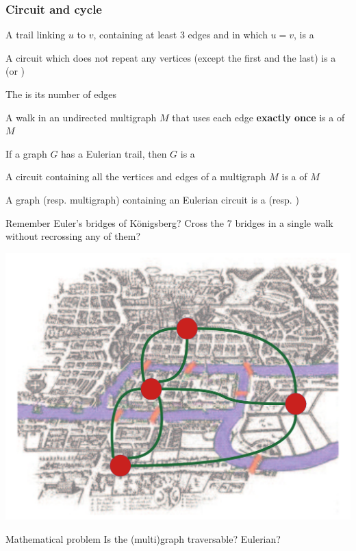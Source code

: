 \documentclass[aspectratio=43]{beamer}
\begin{document}
\begin{frame}\frametitle{Circuit and cycle}
\begin{definition}[Circuit]
A trail linking $u$ to $v$, containing at least 3 edges and in which $u=v$, is a 
\end{definition}
\vfill
\begin{definition}[Cycle]\label{def:cycle}
A circuit which does not repeat any vertices (except the first and the last) is a  (or )
\end{definition}
\vfill
\begin{definition}
The  is its number of edges
\end{definition}
\end{frame}


\begin{frame}
\begin{definition}
	A walk in an undirected multigraph $M$ that uses each edge \textbf{exactly once} is a  of $M$
\end{definition}
\vfill
\begin{definition}
	If a graph $G$ has a Eulerian trail, then $G$ is a 
\end{definition}
\vfill
\begin{definition}
	A circuit containing all the vertices and edges of a multigraph $M$ is a  of $M$
\end{definition}
\vfill
\begin{definition}
	A graph (resp. multigraph) containing an Eulerian circuit is a  (resp. )
\end{definition}
\end{frame}

\begin{frame}{Remember Euler's bridges of K\"onigsberg?}
	Cross the 7 bridges in a single walk without recrossing any of them?
	\begin{center}
	\includegraphics[width=.7\textwidth]{FIGS_slides/bridge_color_with_graph}
	\end{center}
	\begin{block}{Mathematical problem}
		Is the (multi)graph traversable? Eulerian?
	\end{block}
	\end{frame}
\end{document}
